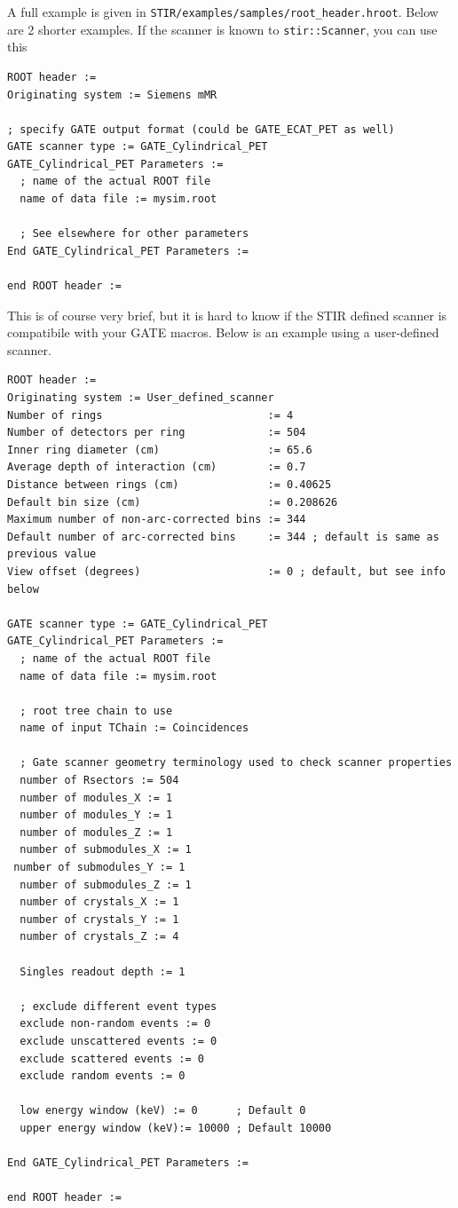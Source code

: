 \documentclass{article}
\begin{document}
A full example is given in \texttt{STIR/examples/samples/root\_header.hroot}. Below are
2 shorter examples.
If the scanner is known to \texttt{stir::Scanner}, you can use this
\begin{verbatim}
ROOT header := 
Originating system := Siemens mMR

; specify GATE output format (could be GATE_ECAT_PET as well)
GATE scanner type := GATE_Cylindrical_PET
GATE_Cylindrical_PET Parameters :=
  ; name of the actual ROOT file
  name of data file := mysim.root

  ; See elsewhere for other parameters
End GATE_Cylindrical_PET Parameters :=

end ROOT header := 
\end{verbatim}
This is of course very brief, but it is hard to know if the STIR defined scanner is
compatibile with your GATE macros. Below is an example using a user-defined scanner. 
\begin{verbatim}
ROOT header := 
Originating system := User_defined_scanner
Number of rings                          := 4
Number of detectors per ring             := 504
Inner ring diameter (cm)                 := 65.6
Average depth of interaction (cm)        := 0.7
Distance between rings (cm)              := 0.40625
Default bin size (cm)                    := 0.208626
Maximum number of non-arc-corrected bins := 344
Default number of arc-corrected bins     := 344 ; default is same as previous value
View offset (degrees)                    := 0 ; default, but see info below

GATE scanner type := GATE_Cylindrical_PET
GATE_Cylindrical_PET Parameters :=
  ; name of the actual ROOT file
  name of data file := mysim.root

  ; root tree chain to use
  name of input TChain := Coincidences

  ; Gate scanner geometry terminology used to check scanner properties
  number of Rsectors := 504 
  number of modules_X := 1 
  number of modules_Y := 1
  number of modules_Z := 1
  number of submodules_X := 1 
 number of submodules_Y := 1
  number of submodules_Z := 1
  number of crystals_X := 1
  number of crystals_Y := 1
  number of crystals_Z := 4

  Singles readout depth := 1

  ; exclude different event types
  exclude non-random events := 0
  exclude unscattered events := 0
  exclude scattered events := 0
  exclude random events := 0

  low energy window (keV) := 0      ; Default 0
  upper energy window (keV):= 10000 ; Default 10000

End GATE_Cylindrical_PET Parameters :=

end ROOT header := 
\end{verbatim}
\end{document}
